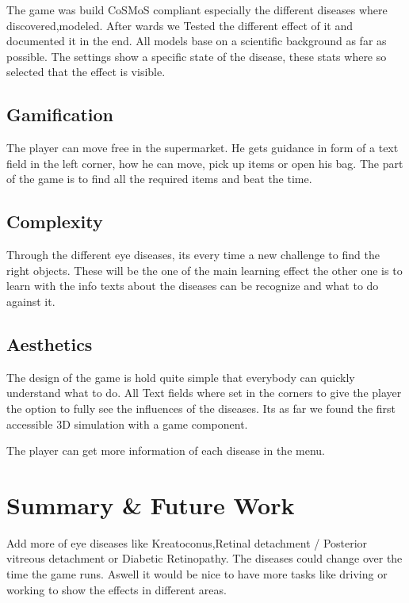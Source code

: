 \documentclass{sig-alternate-05-2015}
\begin{document}
The game was build CoSMoS compliant especially the different diseases where discovered,modeled. After wards we Tested the different effect of it and documented it in the end. All models base on a scientific background as far as possible. The settings show a specific state of the disease, these stats where so selected that the effect is visible.

\subsection{Gamification}

The player can move free in the supermarket. He gets guidance in form of a text field in the left corner, how he can move, pick up items or open his bag. The part of the game is to find all the required items and beat the time.

\subsection{Complexity}

Through the different eye diseases, its every time a new challenge to find the right objects. These will be the one of the main learning effect the other one is to learn with the info texts about the diseases can be recognize and what to do against it.

\subsection{Aesthetics}

The design of the game is hold quite simple that everybody can quickly understand what to do. All Text fields where set in the corners to give the player the option to fully see the influences of the diseases. Its as far we found the first accessible 3D simulation with a game component.

The player can get more information of each disease in the menu.

%
%
\section{Summary \& Future Work}

Add more of eye diseases like Kreatoconus,Retinal detachment / Posterior vitreous detachment or Diabetic Retinopathy. The diseases could change over the time the game runs. Aswell it would be nice to have more tasks like driving or working to show the effects in different areas.
\end{document}
